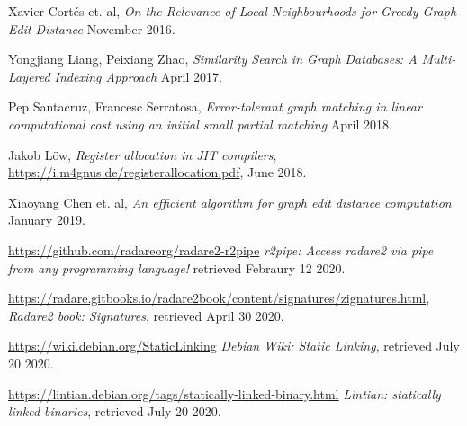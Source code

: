 \documentclass[
    12pt,                               %
    DIV=14,                     %
    parskip=half+,              %
    bigheadings,                %
    cleardoubleempty,   %
    halfparskip,                %
    ]{scrreprt} %
\begin{document}
\begin{thebibliography}{9}
	 Xavier Cortés et. al,
		\textit{On the Relevance of Local Neighbourhoods for Greedy Graph Edit Distance}
		November 2016.
		
	 Yongjiang Liang, Peixiang Zhao,
		\textit{Similarity Search in Graph Databases: A Multi-Layered Indexing Approach}
		April 2017.

	 Pep Santacruz, Francesc Serratosa,
		\textit{Error-tolerant graph matching in linear computational cost using an initial small partial matching}
		April 2018.
		
	 Jakob Löw,
		\textit{Register allocation in JIT compilers},
		\url{https://i.m4gnus.de/registerallocation.pdf},
		June 2018.

	 Xiaoyang Chen et. al,
		\textit{An efficient algorithm for graph edit distance computation}
		January 2019.
		
	 \url{https://github.com/radareorg/radare2-r2pipe}
		\textit{r2pipe: Access radare2 via pipe from any programming language!}
		retrieved Febraury 12 2020.
		
		\url{https://radare.gitbooks.io/radare2book/content/signatures/zignatures.html},
		\textit{Radare2 book: Signatures},
		retrieved April 30 2020.

		\url{https://wiki.debian.org/StaticLinking}
		\textit{Debian Wiki: Static Linking},
		retrieved July 20 2020.

		\url{https://lintian.debian.org/tags/statically-linked-binary.html}
		\textit{Lintian: statically linked binaries},
		retrieved July 20 2020.

\end{thebibliography}

\listoffigures
\end{document}
